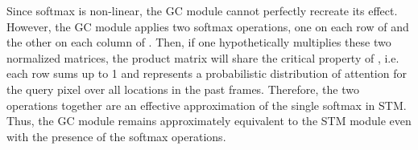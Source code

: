 \documentclass[runningheads]{llncs}
\begin{document}
Since softmax is non-linear, the GC module cannot perfectly recreate its effect. However, the GC module applies two softmax operations, one on each row of  and the other on each column of . Then, if one hypothetically multiplies these two normalized matrices, the product matrix will share the critical property of , i.e. each row sums up to 1 and represents a probabilistic distribution of attention for the query pixel over all locations in the past frames. Therefore, the two operations together are an effective approximation of the single softmax in STM. Thus, the GC module remains approximately equivalent to the STM module even with the presence of the softmax operations. 
\end{document}
